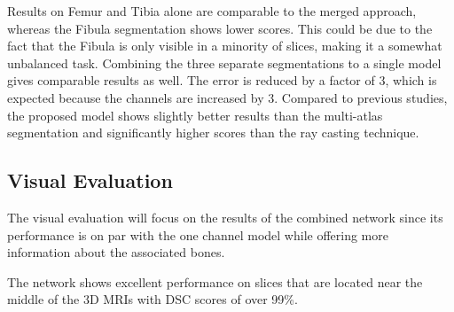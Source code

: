 Results on Femur and Tibia alone are comparable to the merged approach, whereas the Fibula segmentation shows lower scores. This could be due to the fact that the Fibula is only visible in a minority of slices, making it a somewhat unbalanced task. Combining the three separate segmentations to a single model gives comparable results as well. The error is reduced by a factor of 3, which is expected because the channels are increased by 3. Compared to previous studies, the proposed model shows slightly better results than the multi-atlas segmentation and significantly higher scores than the ray casting technique.

\subsection{Visual Evaluation}

The visual evaluation will focus on the results of the combined network since its performance is on par with the one channel model while offering more information about the associated bones.

The network shows excellent performance on slices that are located near the middle of the 3D MRIs with DSC scores of over 99\%.


